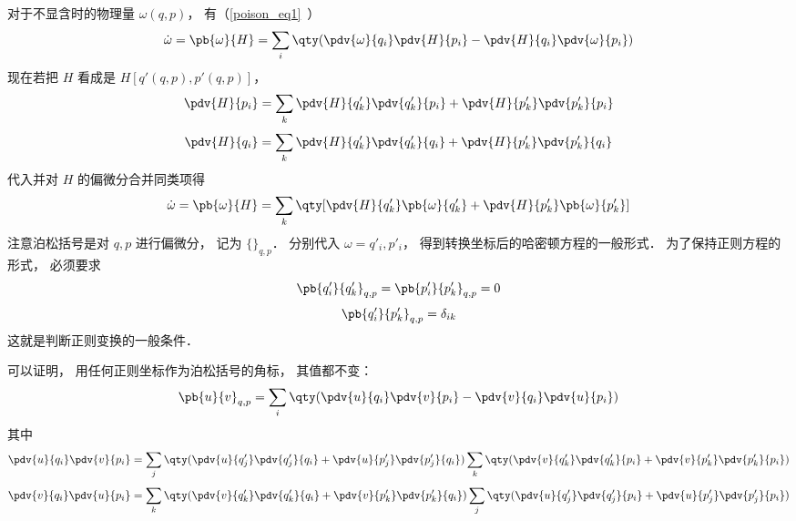 对于不显含时的物理量 $\omega(q, p)$， 有（\autoref{poison_eq1}~）
\begin{equation}
\dot \omega  = \pb{\omega}{H}  = \sum_i \qty(\pdv{\omega}{q_i}\pdv{H}{p_i} - \pdv{H}{q_i} \pdv{\omega}{p_i})
\end{equation}
现在若把 $H$ 看成是 $H[q'(q,p),p'(q,p)]$，  
\begin{equation}
\pdv{H}{p_i} = \sum_k \pdv{H}{q'_k} \pdv{q'_k}{p_i} + \pdv{H}{p'_k} \pdv{p'_k}{p_i}
\end{equation}
\begin{equation}
\pdv{H}{q_i} = \sum_k \pdv{H}{q'_k} \pdv{q'_k}{q_i} + \pdv{H}{p'_k} \pdv{p'_k}{q_i}
\end{equation}
代入并对 $H$ 的偏微分合并同类项得
\begin{equation}
\dot \omega  = \pb{\omega}{H} = \sum_k \qty[ \pdv{H}{q'_k} \pb{\omega}{q'_k} + \pdv{H}{p'_k} \pb{\omega}{p'_k}]
\end{equation}
注意泊松括号是对 $q,p$ 进行偏微分， 记为 $\{ {}\}_{q,p}$．  分别代入 $\omega  = q'_i, p'_i$，  得到转换坐标后的哈密顿方程的一般形式． 为了保持正则方程的形式， 必须要求
\begin{equation}
\pb{q'_i}{q'_k}_{q,p} = \pb{p'_i}{p'_k}_{q,p} = 0
\end{equation}
\begin{equation}\label{ClsMec_eq2}
\pb{q'_i}{p'_k}_{q,p} = \delta_{ik}
\end{equation}
这就是判断正则变换的一般条件．

可以证明， 用任何正则坐标作为泊松括号的角标， 其值都不变：
\begin{equation}\label{ClsMec_eq1}
\pb{u}{v}_{q,p} = \sum_i \qty( \pdv{u}{q_i}\pdv{v}{p_i} - \pdv{v}{q_i}\pdv{u}{p_i} ) 
\end{equation}
其中
\begin{equation}
\pdv{u}{q_i} \pdv{v}{p_i} = \sum_j \qty( \pdv{u}{q'_j} \pdv{q'_j}{q_i} + \pdv{u}{p'_j}\pdv{p'_j}{q_i} ) \sum_k \qty(\pdv{v}{q'_k}\pdv{q'_k}{p_i} + \pdv{v}{p'_k}\pdv{p'_k}{p_i}) 
\end{equation}
\begin{equation}
\pdv{v}{q_i} \pdv{u}{p_i} = \sum_k \qty( \pdv{v}{q'_k}\pdv{q'_k}{q_i} + \pdv{v}{p'_k}\pdv{p'_k}{q_i} ) \sum_j \qty(\pdv{u}{q'_j}\pdv{q'_j}{p_i} + \pdv{u}{p'_j}\pdv{p'_j}{p_i})
\end{equation}
 
